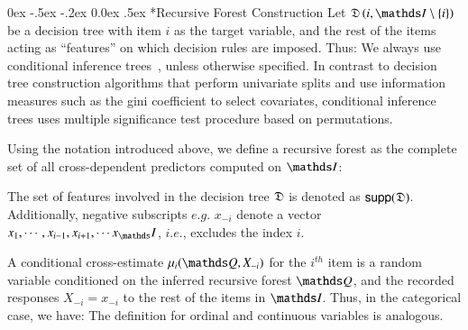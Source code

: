 \documentclass[onecolumn, compsoc,11pt]{IEEEtran}
\makeatletter
\renewcommand\subsubsection{\@startsection {section}{1}{\z@}%
                                   {0ex \@plus -.5ex \@minus -.2ex}%
                                   {0.0ex \@plus.5ex}%
                                   {\fontsize{10}{10}\selectfont\bfseries\sffamily\color{Red4}}}
\makeatother
\begin{document}
\subsubsection*{Recursive Forest Construction}
Let $\D\left (i,\I\setminus\{i\}\right )$ be a decision tree with  item $i$ as the target variable, and the rest of the  items acting as ``features'' on which  decision rules are imposed. Thus:
%
{\noindent}We  always use conditional inference trees~\cite{Sard-Espinosa:2017:CIT:3108944.3109065}, unless otherwise specified.  In contrast to decision tree construction algorithms that perform univariate splits and use information measures such as the gini coefficient to select covariates, conditional inference trees uses multiple significance test procedure based on permutations.
%
\begin{defn} Using the notation introduced above, we define a recursive forest as the complete set of all cross-dependent predictors  computed on $\I$:
\end{defn}
\begin{notn}
  The set of features involved in the decision tree $\mathfrak{D}$ is denoted as $\mathop{\mathsf{supp}}(\mathfrak{D})$.
  Additionally, negative subscripts $e.g.$ $x_{-i}$ denote a vector $x_1,\cdots,x_{i-1},x_{i+1}, \cdots x_\I$, $i.e.$, excludes the index $i$.
\end{notn}
\begin{defn}
A conditional cross-estimate $\mu_i(\Q,X_{-i})$ for the $i^{th}$ item is a random variable conditioned on the inferred recursive forest $\Q$, and the recorded responses $X_{-i}=x_{-i}$ to the rest of the items in $\I$. Thus, in the categorical case, we have:
The definition  for  ordinal and continuous variables is analogous.
  \end{defn} 
\end{document}
